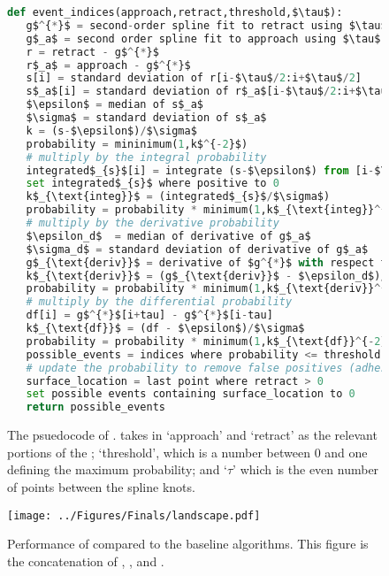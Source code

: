 \begin{figure}[htp]
\caption[\name{} psuedocode]{\noindent{} The psuedocode of \name{}. \name{} takes in `approach' and `retract' as the relevant portions of the \fec{}; `threshold', which is a number between 0 and one defining the maximum probability; and `$\tau$' which is the even number of points between the spline knots.  }
  \begin{lstlisting}[language=Python]
def event_indices(approach,retract,threshold,$\tau$):
   g$^{*}$ = second-order spline fit to retract using $\tau$ for knots
   g$_a$ = second order spline fit to approach using $\tau$ for knots
   r = retract - g$^{*}$
   r$_a$ = approach - g$^{*}$
   s[i] = standard deviation of r[i-$\tau$/2:i+$\tau$/2]
   s$_a$[i] = standard deviation of r$_a$[i-$\tau$/2:i+$\tau$/2]
   $\epsilon$ = median of s$_a$
   $\sigma$ = standard deviation of s$_a$
   k = (s-$\epsilon$)/$\sigma$
   probability = mininimum(1,k$^{-2}$)
   # multiply by the integral probability 
   integrated$_{s}$[i] = integrate (s-$\epsilon$) from [i-$\tau$] to [i+$\tau$]
   set integrated$_{s}$ where positive to 0
   k$_{\text{integ}}$ = (integrated$_{s}$/$\sigma$)
   probability = probability * minimum(1,k$_{\text{integ}}^{-2}$)
   # multiply by the derivative probability
   $\epsilon_d$  = median of derivative of g$_a$
   $\sigma_d$ = standard deviation of derivative of g$_a$
   g$_{\text{deriv}}$ = derivative of $g^{*}$ with respect to time
   k$_{\text{deriv}}$ = (g$_{\text{deriv}}$ - $\epsilon_d$)/$\sigma_d$
   probability = probability * minimum(1,k$_{\text{deriv}}^{-2}$)
   # multiply by the differential probability 
   df[i] = g$^{*}$[i+tau] - g$^{*}$[i-tau]
   k$_{\text{df}}$ = (df - $\epsilon$)/$\sigma$
   probability = probability * minimum(1,k$_{\text{df}}^{-2}$)
   possible_events = indices where probability <= threshold
   # update the probability to remove false positives (adhesions)
   surface_location = last point where retract > 0
   set possible events containing surface_location to 0
   return possible_events
\end{lstlisting}
\end{figure}


\begin{figure}[htpb]
\caption[Algorithm Performance]{\noindent{} Performance of \name{} compared to the baseline algorithms. This figure is the concatenation of , , and . }
\centering
\texttt{[image: ../Figures/Finals/landscape.pdf]}%
\end{figure}



